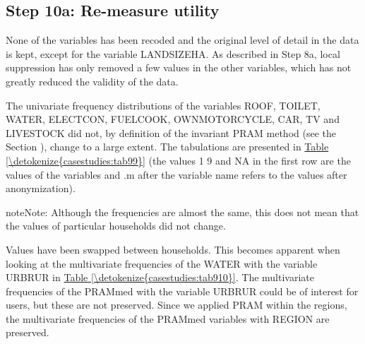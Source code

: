 \documentclass[letterpaper,10pt,english]{sphinxmanual}
\begin{document}
\subsection{Step 10a: Re-measure utility}
\label{\detokenize{casestudies:step-10a-re-measure-utility}}
None of the variables has been recoded and the original level of detail
in the data is kept, except for the variable LANDSIZEHA. As described in
Step 8a, local suppression has only removed a few values in the other
variables, which has not greatly reduced the validity of the data.

The univariate frequency distributions of the variables ROOF, TOILET,
WATER, ELECTCON, FUELCOOK, OWNMOTORCYCLE, CAR, TV and LIVESTOCK did not,
by definition of the invariant PRAM method (see the Section
), change
to a large extent. The tabulations are presented in \hyperref[\detokenize{casestudies:tab99}]{Table \ref{\detokenize{casestudies:tab99}}} (the
values 1 \textendash{} 9 and NA in the first row are the values of the variables and
.m after the variable name refers to the values after anonymization).

\begin{sphinxadmonition}{note}{Note:}
Although the frequencies are almost the same, this does not mean
that the values of particular households did not change.
\end{sphinxadmonition}

Values have been swapped between households. This becomes apparent when looking at
the multivariate frequencies of the WATER with the variable URBRUR in
\hyperref[\detokenize{casestudies:tab910}]{Table \ref{\detokenize{casestudies:tab910}}}. The multivariate frequencies of the PRAMmed with the
variable URBRUR could be of interest for users, but these are not
preserved. Since we applied PRAM within the regions, the multivariate
frequencies of the PRAMmed variables with REGION are preserved.
\end{document}
